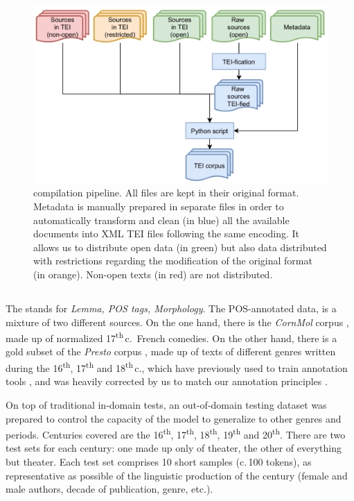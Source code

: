 \begin{figure}[ht]
    \centering
    \includegraphics[width=0.75\linewidth]{static/media/mod_eval/dalembert/corpus_trans.png}
    \caption{\freemmax compilation pipeline. All files are kept in their original format. Metadata is manually prepared in separate files in order to automatically transform and clean (in blue) all the available documents into XML TEI files following the same encoding. It allows us to distribute open data (in green) but also data distributed with restrictions regarding the modification of the original format (in orange). Non-open texts (in red) are not distributed.}
    \label{fig:pipeline}
\end{figure}

\subsection{\texorpdfstring{\freemlpm}{FREEM LPM}}\label{freem_lpm}

The \freemlpm \citep{gabay-etal-2020-standardizing} stands for \emph{Lemma, POS tags, Morphology}. The POS-annotated data, is a mixture of two different sources. On the one hand, there is the \emph{CornMol} corpus \citep{camps-etal-2021-corpus}, made up of normalized 17\textsuperscript{th}\,c.~French comedies. On the other hand, there is a gold subset of the \emph{Presto} corpus \citep{blumenthal-etal-2017-presto}, made up of texts of different genres written during the 16\textsuperscript{th}, 17\textsuperscript{th} and 18\textsuperscript{th}\,c., which have previously used to train annotation tools \citep{diwersy-etal-2017-ressources}, and was heavily corrected by us to match our annotation principles \citep{gabay-etal-2020-manuel}.

On top of traditional in-domain tests, an out-of-domain testing dataset was prepared to control the capacity of the model to generalize to other genres and periods. Centuries covered are the 16\textsuperscript{th}, 17\textsuperscript{th}, 18\textsuperscript{th}, 19\textsuperscript{th} and 20\textsuperscript{th}. There are two test sets for each century: one made up only of theater, the other of everything but theater. Each test set comprises 10 short samples (c.\,100 tokens), as representative as possible of the linguistic production of the century (female and male authors, decade of publication, genre, etc.).


